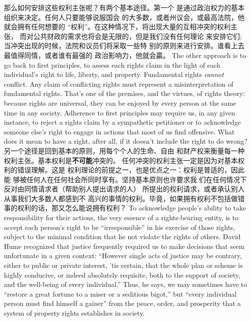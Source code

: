 \begin{paracol}{2}
那么如何安排这些权利主张呢？有两个基本途径。第一个
是通过政治权力的基本组织来决定。任何人只要能够说服国会
的大多数，或者州议会，或最高法院，他就会拥有任何想要的
“权利”。在这种情况下，将出现大量的互相冲突的权利主张，
而对公共财政的需求也将会是无限的，但是我们没有任何理论
来安排它们; 当冲突出现的时候，法院和议员们将采取一些特
别的原则来进行安排。谁看上去最值得同情，或者谁有最强的
政治影响力，他就会贏。
\switchcolumn*
The other approach is to go back to first principles, to assess
each rights claim in the light of each individual's right to life,
liberty, and property. Fundamental rights \textit{cannot} conflict. Any
claim of conflicting rights must represent a misinterpretation of
fundamental rights. That's one of the premises, and the virtues,
of rights theory: because rights are universal, they can be enjoyed by every person at the same time in any society. Adherence to first principles may require us, in any given instance, to
reject a rights claim by a sympathetic petitioner or to acknowledge someone else's right to engage in actions that most of us
find offensive. What does it mean to have a right, after all, if it
doesn't include the right to do wrong?
\switchcolumn
另一个途径是回到基本的原则，用每个个人的生命、自由
和财产权来衡量每一种权利主张。基本权利是\textbf{不可能}冲突的。
任何冲突的权利主张一定是因为对基本权利的错误理解。这是
权利理论的前提之一，也是优点之一：权利是普适的，因此能
够被任何人在任何社会所同时享有。坚持基本原则也许要求我
们在任何情况下反对由同情请求者（帮助别人提出请求的人）
所提出的权利请求，或者承认别人从事我们大多数人都感到不
高兴的事情的权利。毕竟，如果拥有权利不包括做错事的权利的话，那又怎么能说拥有权利？
\switchcolumn*
To acknowledge people's ability to take responsibility for
their actions, the very essence of a rights-bearing entity, is to accept each person's right to be ``irresponsible'' in his exercise of
those rights, subject to the minimal condition that he not violate the rights of others. David Hume recognized that justice
frequently required us to make decisions that seem unfortunate
in a given context: ``However single acts of justice may be contrary, either to public or private interest, 'tis certain, that the
whole plan or scheme is highly conducive, or indeed absolutely
requisite, both to the support of society, and the well-being of
every individual.'' Thus, he says, we may sometimes have to
``restore a great fortune to a miser or a seditious bigot,'' but
``every individual person must find himself a gainer'' from the
peace, order, and prosperity that a system of property rights establishes in society.
\switchcolumn

\end{paracol}
